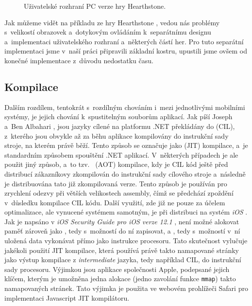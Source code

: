 \begin{figure}[!tbp]
	\centering
	\hfill
	\caption{Uživatelské rozhraní PC verze hry Hearthstone.}
	\label{fig:hearthstone_pc}
\end{figure}

Jak můžeme vidět na příkladu ze hry Hearthstone \citep{site:hearthstone}, vedou nás problémy s~velikostí obrazovek a~dotykovým ovládáním k~separátnímu designu a~implementaci uživatelského rozhraní a~některých částí her. Pro tuto separátní implementaci jsme v~naší práci připravili základní kostru, upustili jsme ovšem od konečné implementace z~důvodu nedostatku času.

\subsection{Kompilace}
Dalším rozdílem, tentokrát s~rozdílným chováním i~mezi jednotlivými mobilními systémy, je jejich chování k~spustitelným souborům aplikací. Jak píší Joseph a~Ben Albahari \citep[str.~3,4]{book:cs7nutshell}, jsou jazyky cílené na platformu .NET překládány do   (CIL), z~kterého jsou obvykle až za běhu aplikace kompilovány do instrukční sady stroje, na kterém právě běží. Tento způsob se označuje jako   (JIT) kompilace, a~je standardním způsobem spouštění .NET aplikací. V~některých případech je ale použit jiný způsob, a~to tzv.~  (AOT) kompilace, kdy je CIL kód ještě před distribucí zákazníkovy zkompilován do instrukční sady cílového stroje a~následně je distribuována tato již zkompilovaná verze. Tento způsob je používán pro zrychlení odezvy při větších velikostech assembly, čímž se předchází zpoždění v~důsledku kompilace CIL kódu. Další využití, zde již ne pouze za účelem optimalizace, ale vynucené systémem samotným, je při distribuci na systém \emph{iOS} \citep{site:aot}. Jak je napsáno v \textit{iOS Security Guide pro iOS verze 12.1} \citep[str.~27]{book:iossecurityguide}, není možné alokovat paměť zároveň jako \textit{ }, tedy s~možností do ní zapisovat, a \textit{ }, tedy s~možností v~ní uložená data vykonávat přímo jako instrukce procesoru. Tato skutečnost vylučuje jakékoli použití JIT kompilace, která používá právě takto namapované stránky jako výstup kompilace z \textit{intermediate} jazyka, tedy například CIL, do instrukční sady procesoru. Výjimkou jsou aplikace společnosti Apple, podepsané jejich klíčem, kterým je umožněna jedna alokace (jedno zavolání funkce \texttt{mmap}) takto namapovaných stránek. Tato výjimka je použita ve webovém prohlížeči Safari pro implementaci Javascript JIT kompilátoru.  

